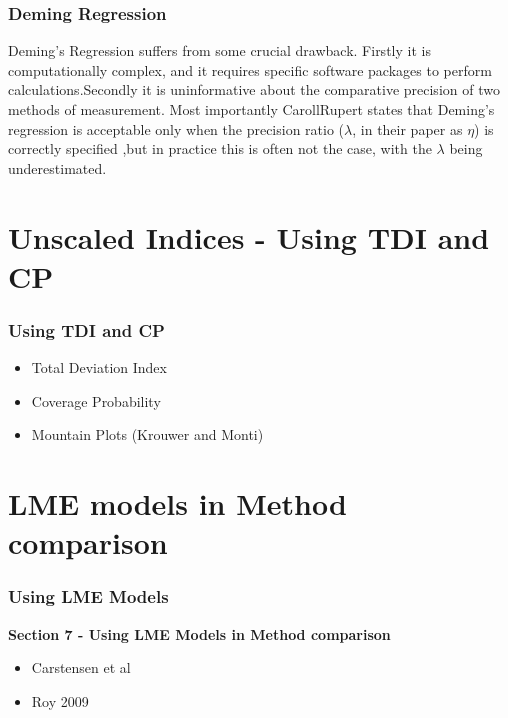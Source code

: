 \documentclass[compress]{beamer}        %
\begin{document}
\begin{frame}
\frametitle{Deming Regression}
Deming's Regression suffers from some crucial drawback. Firstly it
is computationally complex, and it requires specific software
packages to perform calculations.Secondly it is uninformative
about the comparative precision of two methods of measurement.
Most importantly \alert{CarollRupert} states that Deming's
regression is acceptable only when the precision ratio ($\lambda$,
in their paper as $\eta$) is correctly specified ,but in practice
this is often not the case, with the $\lambda$ being
underestimated.
\end{frame}

\section{Unscaled Indices - Using TDI and CP}
\begin{frame}
\frametitle{Using TDI and CP}
\begin{itemize}
\item Total Deviation Index
\item Coverage Probability
\item Mountain Plots (Krouwer and Monti)
\end{itemize}

\end{frame}
\section{LME models in Method comparison}

\begin{frame}
\frametitle{Using LME Models}
\textbf{Section 7 - Using LME Models in Method comparison}
\begin{itemize}
\item Carstensen et al 
\item Roy 2009
\end{itemize}
\end{frame}
\end{document}
